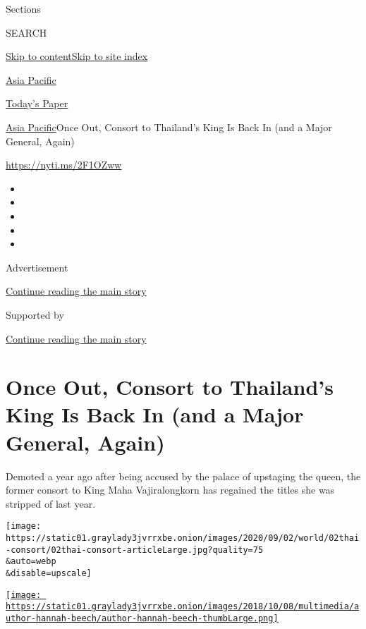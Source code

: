 Sections

SEARCH

\protect\hyperlink{site-content}{Skip to
content}\protect\hyperlink{site-index}{Skip to site index}

\href{https://www.nytimes3xbfgragh.onion/section/world/asia}{Asia
Pacific}

\href{https://myaccount.nytimes3xbfgragh.onion/auth/login?response_type=cookie\&client_id=vi}{}

\href{https://www.nytimes3xbfgragh.onion/section/todayspaper}{Today's
Paper}

\href{/section/world/asia}{Asia Pacific}\textbar{}Once Out, Consort to
Thailand's King Is Back In (and a Major General, Again)

\url{https://nyti.ms/2F1OZww}

\begin{itemize}
\item
\item
\item
\item
\item
\end{itemize}

Advertisement

\protect\hyperlink{after-top}{Continue reading the main story}

Supported by

\protect\hyperlink{after-sponsor}{Continue reading the main story}

\hypertarget{once-out-consort-to-thailands-king-is-back-in-and-a-major-general-again}{%
\section{Once Out, Consort to Thailand's King Is Back In (and a Major
General,
Again)}\label{once-out-consort-to-thailands-king-is-back-in-and-a-major-general-again}}

Demoted a year ago after being accused by the palace of upstaging the
queen, the former consort to King Maha Vajiralongkorn has regained the
titles she was stripped of last year.

\texttt{[image: https://static01.graylady3jvrrxbe.onion/images/2020/09/02/world/02thai-consort/02thai-consort-articleLarge.jpg?quality=75\\\&auto=webp\\\&disable=upscale]}

\href{https://www.nytimes3xbfgragh.onion/by/hannah-beech}{\texttt{[image: https://static01.graylady3jvrrxbe.onion/images/2018/10/08/multimedia/author-hannah-beech/author-hannah-beech-thumbLarge.png]}}


